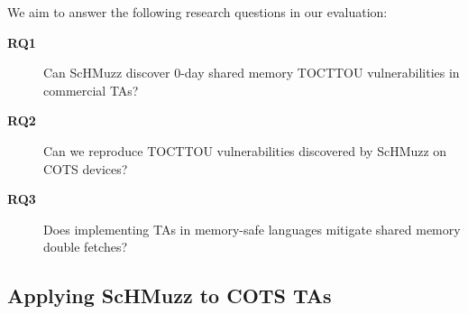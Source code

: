 \documentclass[letterpaper,twocolumn,10pt]{article}
\newcommand{\sysname}{ScHMuzz\xspace}
\begin{document}



We aim to answer the following research questions in our evaluation:
\begin{description}

        \item[\textbf{RQ1}] Can \sysname discover 0-day shared memory TOCTTOU vulnerabilities in commercial TAs?

        \item[\textbf{RQ2}] Can we reproduce TOCTTOU vulnerabilities discovered by \sysname on COTS devices? 
        
        \item[\textbf{RQ3}] Does implementing TAs in memory-safe languages mitigate shared memory double fetches?

\end{description}


\subsection{Applying \sysname to COTS TAs}\label{sec:cotsfuzz}
\end{document}
